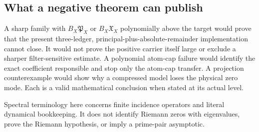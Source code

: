 \subsection{What a negative theorem can publish}

A sharp family with
\(B_X\mathfrak P_X\) or \(B_X\mathfrak X_X\) polynomially above the
target would prove that the present three-ledger,
principal-plus-absolute-remainder implementation cannot close.
It would not prove the positive carrier itself large or exclude a
sharper filter-sensitive estimate.  A polynomial atom-cap failure
would identify the exact coefficient responsible and stop only the
atom-cap transfer.  A projection counterexample would show
why a compressed model loses the physical zero mode.  Each is a
valid mathematical conclusion when stated at its actual level.

\begin{remark}
Spectral terminology here concerns finite incidence operators and
literal dynamical bookkeeping.  It does not identify Riemann zeros
with eigenvalues, prove the Riemann hypothesis, or imply a
prime-pair asymptotic.
\end{remark}
